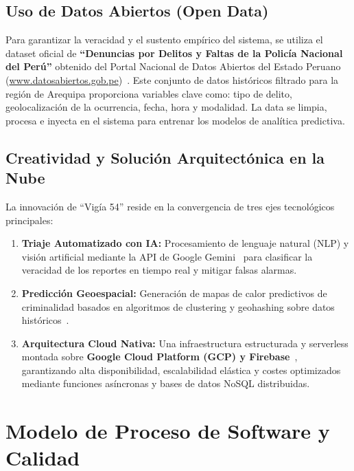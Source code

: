 \documentclass[conference]{IEEEtran}
\begin{document}
\subsection{Uso de Datos Abiertos (Open Data)}
Para garantizar la veracidad y el sustento empírico del sistema, se utiliza el dataset oficial de \textbf{``Denuncias por Delitos y Faltas de la Policía Nacional del Perú''} obtenido del Portal Nacional de Datos Abiertos del Estado Peruano (\url{www.datosabiertos.gob.pe})~\cite{datosabiertos}. Este conjunto de datos históricos filtrado para la región de Arequipa proporciona variables clave como: tipo de delito, geolocalización de la ocurrencia, fecha, hora y modalidad. La data se limpia, procesa e inyecta en el sistema para entrenar los modelos de analítica predictiva.

\subsection{Creatividad y Solución Arquitectónica en la Nube}
La innovación de ``Vigía 54'' reside en la convergencia de tres ejes tecnológicos principales:
\begin{enumerate}
    \item \textbf{Triaje Automatizado con IA:} Procesamiento de lenguaje natural (NLP) y visión artificial mediante la API de Google Gemini~\cite{gemini} para clasificar la veracidad de los reportes en tiempo real y mitigar falsas alarmas.
    \item \textbf{Predicción Geoespacial:} Generación de mapas de calor predictivos de criminalidad basados en algoritmos de clustering y geohashing sobre datos históricos~\cite{harries}.
    \item \textbf{Arquitectura Cloud Nativa:} Una infraestructura estructurada y serverless montada sobre \textbf{Google Cloud Platform (GCP) y Firebase}~\cite{firestore}, garantizando alta disponibilidad, escalabilidad elástica y costes optimizados mediante funciones asíncronas y bases de datos NoSQL distribuidas.
\end{enumerate}

\section{Modelo de Proceso de Software y Calidad}
\end{document}
